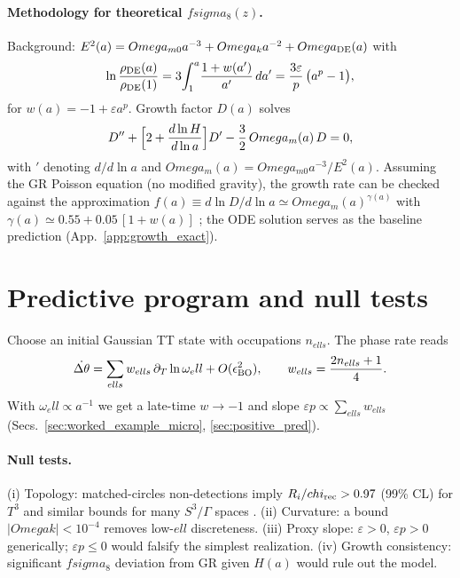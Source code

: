 \documentclass[aps,prd,twocolumn,amsmath,amssymb,nofootinbib,superscriptaddress]{revtex4-2}
\def\mathcal#1{#1}%
\def\Ok{Omega k}%
\def\Omega{Omega}\def\sigma{sigma}\def\chi{chi}\def\ell{ell}%
\newcommand{\Ok}{\Omega_k}
\begin{document}
\paragraph*{Methodology for theoretical $f\sigma_8(z)$.}
Background:
$E^2(a)=\Omega_{m0}a^{-3}+\Omega_k a^{-2}+\Omega_{\rm DE}(a)$ with
\[
\ln\frac{\rho_{\rm DE}(a)}{\rho_{\rm DE}(1)}
=3\!\int_1^a\!\frac{1+w(a')}{a'}\,da'
=\frac{3\varepsilon}{p}\,\big(a^p-1\big),
\]
for $w(a)=-1+\varepsilon a^p$.
Growth factor $D(a)$ solves
\begin{equation}
D''+\Bigl[2+\frac{d\ln H}{d\ln a}\Bigr]D'-\frac{3}{2}\,\Omega_m(a)\,D=0,
\end{equation}
with $'$ denoting $d/d\ln a$ and $\Omega_m(a)=\Omega_{m0}a^{-3}/E^2(a)$.
Assuming the GR Poisson equation (no modified gravity),
the growth rate can be checked against the approximation
$f(a)\equiv d\ln D/d\ln a \simeq \Omega_m(a)^{\gamma(a)}$ with
$\gamma(a)\simeq 0.55+0.05\,[1+w(a)]$ \cite{Linder2005};
the ODE solution serves as the baseline prediction (App.~\ref{app:growth_exact}).

\section{Predictive program and null tests}
\label{sec:predictive}
Choose an initial Gaussian TT state with occupations $n_{\ell s}$. The phase rate reads
\begin{equation}
\dot{\Delta\theta}
=\sum_{\ell s} w_{\ell s}\,\partial_T\ln\omega_\ell
+\mathcal{O}(\epsilon_{\rm BO}^2),
\qquad
w_{\ell s}=\frac{2n_{\ell s}+1}{4}.
\end{equation}
With $\omega_\ell\propto a^{-1}$ we get a late-time $w\to -1$ and slope $\varepsilon p \propto \sum_{\ell s} w_{\ell s}$ (Secs.~\ref{sec:worked_example_micro}, \ref{sec:positive_pred}).

\paragraph*{Null tests.}
(i) Topology: matched-circles non-detections imply $R_i/\chi_{\rm rec}>0.97$ (99\% CL) for $T^3$ and similar bounds for many $S^3/\Gamma$ spaces \cite{Planck2015Topo}.
(ii) Curvature: a bound $|\Ok|<10^{-4}$ removes low-$\ell$ discreteness.
(iii) Proxy slope: $\varepsilon>0$, $\varepsilon p>0$ generically; $\varepsilon p\le 0$ would falsify the simplest realization.
(iv) Growth consistency: significant $f\sigma_8$ deviation from GR given $H(a)$ would rule out the model.
\end{document}
